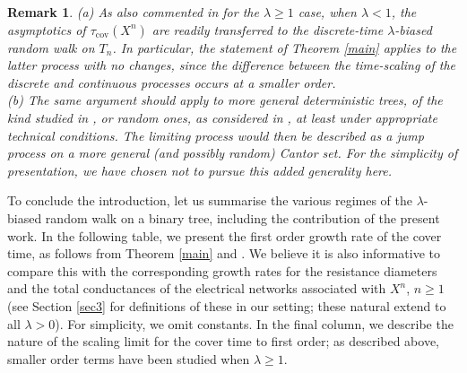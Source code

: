 \documentclass[a4paper, 11pt]{article}
\newtheorem{rem}[theorem]{Remark}
\begin{document}
\begin{rem}
(a) As also commented in \cite{Bai,CLS} for the $\lambda\geq 1$ case, when $\lambda<1$, the asymptotics of $\tau_{\mathrm{cov}}(X^n)$ are readily transferred to the discrete-time $\lambda$-biased random walk on $T_n$. In particular, the statement of Theorem \ref{main} applies to the latter process with no changes, since the difference between the time-scaling of the discrete and continuous processes occurs at a smaller order.\\
(b) The same argument should apply to more general deterministic trees, of the kind studied in \cite{Kigbound,Kigbound2}, or random ones, as considered in \cite{Bai,Tokushige}, at least under appropriate technical conditions. The limiting process would then be described as a  jump process on a more general (and possibly random) Cantor set. For the simplicity of presentation, we have chosen not to pursue this added generality here.
\end{rem}

To conclude the introduction, let us summarise the various regimes of the $\lambda$-biased random walk on a binary tree, including the contribution of the present work. In the following table, we present the first order growth rate of the cover time, as follows from Theorem \ref{main} and \cite{Bai,CLS}. We believe it is also informative to compare this with the corresponding growth rates for the resistance diameters and the total conductances of the electrical networks associated with $X^n$, $n\geq 1$ (see Section \ref{sec3} for definitions of these in our setting; these natural extend to all $\lambda>0$). For simplicity, we omit constants. In the final column, we describe the nature of the scaling limit for the cover time to first order; as described above, smaller order terms have been studied when $\lambda\geq 1$.
\smallskip
\end{document}
